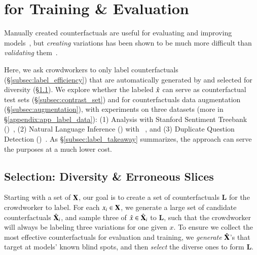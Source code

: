 \section{\sysname for Training \& Evaluation}
\label{sec:app_label}
Manually created counterfactuals are useful for evaluating and improving models~\cite{gardner2020contrast,kaushik2019learning}, but \emph{creating} variations has been shown to be much more difficult than \emph{validating} them~\cite{ribeiro2018sear}.

Here, we ask crowdworkers to only label counterfactuals (\S\ref{subsec:label_efficiency}) that are automatically generated by \sysname and selected for diversity (\S\ref{subsec:gen_counterfactual_for_labeling}).
We explore whether the labeled \sysname $\hat{x}$ can serve as counterfactual test sets (\S\ref{subsec:contrast_set}) and for counterfactuals data augmentation (\S\ref{subsec:augmentation}), with experiments on three datasets (more in \S\ref{appendix:app_label_data}):
(1) \sst Analysis with Stanford Sentiment Treebank (\dsst)~\cite{socher2013recursive},
(2) Natural Language Inference (\nli) with \dnli~\cite{bowman-etal-2015-large}, and 
(3) Duplicate Question Detection (\dqqp)~\cite{wang2018glue}.
As \S\ref{subsec:label_takeaway} summarizes, the approach can serve the purposes at a much lower cost.


\subsection{Selection: Diversity \& Erroneous Slices }
\label{subsec:gen_counterfactual_for_labeling}


Starting with a set of $\mathbf{X}$, our goal is to create a set of counterfactuals $\mathbf{L}$ for the crowdworker to label.
For each $x_i \in \mathbf{X}$, we generate a large set of candidate counterfactuals $\hat{\mathbf{X}}_i$, and sample three of $\hat{x} \in \hat{\mathbf{X}}_i$ to $\mathbf{L}$, such that the crowdworker will always be labeling three variations for one given $x$.
To ensure we collect the most effective counterfactuals for evaluation and training, we \emph{generate} $\hat{\mathbf{X}}$'s that target at models' known blind spots, and then \emph{select} the diverse ones to form $\mathbf{L}$.


